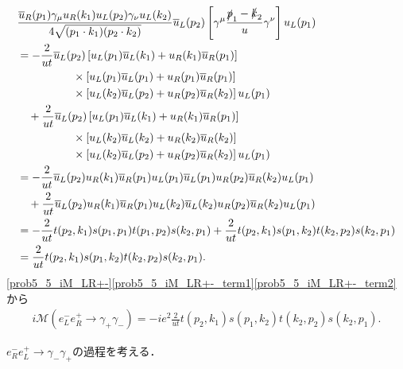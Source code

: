 \begin{align}
  \begin{split}
    & \frac{\overline{u}_R(p_1)\gamma_\mu u_R(k_1) u_L(p_2)\gamma_\nu u_L(k_2)}{4\sqrt{(p_1 \cdot k_1)(p_2 \cdot k_2)}} \overline{u}_L(p_2)
    \left[ \gamma^\mu \frac{\slashed{p}_1 - \slashed{k}_2}{u} \gamma^\nu \right] u_L(p_1) \\
    &= -\frac{2}{ut} \overline{u}_L(p_2) \left[ u_L(p_1)\overline{u}_L(k_1) + u_R(k_1)\overline{u}_R(p_1) \right] \\
    &\qquad\qquad\quad\times \left[ u_L(p_1)\overline{u}_L(p_1) + u_R(p_1)\overline{u}_R(p_1) \right] \\
    &\qquad\qquad\quad\times \left[ u_L(k_2)\overline{u}_L(p_2) + u_R(p_2)\overline{u}_R(k_2) \right] u_L(p_1) \\
    &\quad +\frac{2}{ut} \overline{u}_L(p_2) \left[ u_L(p_1)\overline{u}_L(k_1) + u_R(k_1)\overline{u}_R(p_1) \right] \\
    &\qquad\qquad\quad\times \left[ u_L(k_2)\overline{u}_L(k_2) + u_R(k_2)\overline{u}_R(k_2) \right] \\
    &\qquad\qquad\quad\times \left[ u_L(k_2)\overline{u}_L(p_2) + u_R(p_2)\overline{u}_R(k_2) \right] u_L(p_1) \\
    &= -\frac{2}{ut} \overline{u}_L(p_2) u_R(k_1)\overline{u}_R(p_1) u_L(p_1)\overline{u}_L(p_1) u_R(p_2)\overline{u}_R(k_2) u_L(p_1) \\
    &\quad +\frac{2}{ut} \overline{u}_L(p_2) u_R(k_1)\overline{u}_R(p_1) u_L(k_2)\overline{u}_L(k_2) u_R(p_2)\overline{u}_R(k_2) u_L(p_1) \\
    &= -\frac{2}{ut} t(p_2, k_1) s(p_1, p_1) t(p_1, p_2) s(k_2, p_1) + \frac{2}{ut} t(p_2, k_1) s(p_1, k_2) t(k_2, p_2) s(k_2, p_1) \\
    &= \frac{2}{ut} t(p_2, k_1) s(p_1, k_2) t(k_2, p_2) s(k_2, p_1) .
  \end{split}
  \label{prob5_5_iM_LR+-_term2}
\end{align}
\eqref{prob5_5_iM_LR+-}\eqref{prob5_5_iM_LR+-_term1}\eqref{prob5_5_iM_LR+-_term2}から
\begin{align}
  i\mathcal{M}(e^-_L e^+_R \to \gamma_+\gamma_-) = -ie^2 \frac{2}{ut} t(p_2, k_1) s(p_1, k_2) t(k_2, p_2) s(k_2, p_1) . \label{prob5_5_iM_LR+-_cal}
\end{align}

$e^-_R e^+_L \to \gamma_-\gamma_+$の過程を考える．

